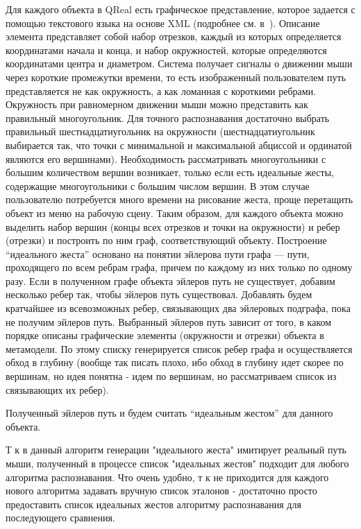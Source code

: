 \documentclass[a5paper]{article}
\begin{document}
Для каждого объекта в QReal есть графическое представление, которое задается с помощью текстового языка на основе XML (подробнее см. в~\cite{qreal}). Описание элемента представляет собой набор отрезков, каждый из которых определяется координатами начала и конца, и набор окружностей, которые определяются координатами центра и диаметром. Система получает сигналы о движении мыши через короткие промежутки времени, то есть изображенный пользователем путь представляется не как окружность, а как ломанная с короткими ребрами. Окружность при равномерном движении мыши можно представить как правильный многоугольник. Для точного распознавания достаточно выбрать правильный шестнадцатиугольник на окружности (шестнадцатиугольник выбирается так, что точки с минимальной и максимальной абциссой и ординатой являются его вершинами). Необходимость рассматривать многоугольники с большим количеством вершин возникает, только если есть идеальные жесты, содержащие многоугольники с большим числом вершин. В этом случае пользователю потребуется много времени на рисование жеста, проще перетащить объект из меню на рабочую сцену. Таким образом, для каждого объекта можно выделить набор вершин (концы всех отрезков и точки на окружности) и ребер (отрезки) и построить по ним граф, соответствующий объекту. Построение ``идеального жеста'' основано на понятии эйлерова пути графа --- пути, проходящего по всем ребрам графа, причем по каждому из них только по одному разу. Если в полученном графе объекта эйлеров путь не существует, добавим несколько ребер так, чтобы эйлеров путь существовал. Добавлять будем кратчайшее из всевозможных ребер, связывающих два эйлеровых подграфа, пока не получим эйлеров путь. Выбранный эйлеров путь зависит от того, в каком порядке описаны графические элементы (окружности и отрезки) объекта в метамодели. По этому списку генерируется список ребер графа и осуществляется обход в глубину (вообще так писать плохо, ибо обход в глубину идет скорее по вершинам, но идея понятна - идем по вершинам, но рассматриваем список из связывающих их ребер).

Полученный эйлеров путь и будем считать ``идеальным жестом'' для данного объекта. 

Т к в данный алгоритм генерации "идеального жеста" имитирует реальный путь мыши, полученный в процессе список "идеальных жестов" подходит для любого алгоритма распознавания. Что очень удобно, т к не приходится для каждого нового алгоритма задавать вручную список эталонов - достаточно просто предоставить список идеальных жестов алгоритму распознавания для последующего сравнения.
\end{document}
